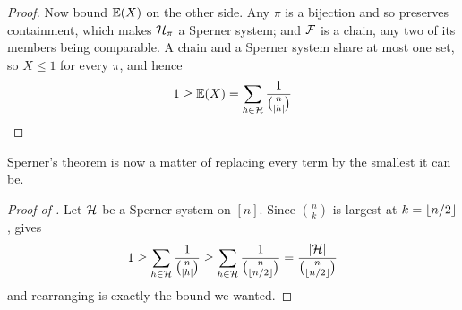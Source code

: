 \begin{proof}
    Now bound $\mathbb{E}\!\left( X \right)$ on the other side. Any $\pi$ is a bijection and so preserves containment, which makes $\mathcal{H}_{\pi}$ a Sperner system; and $\mathcal{F}$ is a chain, any two of its members being comparable. A chain and a Sperner system share at most one set, so $X \leq 1$ for every $\pi$, and hence
    \begin{align*}
        1 \geq \mathbb{E}\!\left( X \right) = \sum_{h \in \mathcal{H}} \frac{1}{\binom{n}{\left\lvert h \right\rvert}}
    \end{align*}
\end{proof}

Sperner's theorem is now a matter of replacing every term by the smallest it can be.

\begin{proof}[Proof of ]
    Let $\mathcal{H}$ be a Sperner system on $[n]$. Since $\binom{n}{k}$ is largest at $k = \left\lfloor n / 2 \right\rfloor$,  gives
    \begin{align*}
        1 \geq \sum_{h \in \mathcal{H}} \frac{1}{\binom{n}{\left\lvert h \right\rvert}} \geq \sum_{h \in \mathcal{H}} \frac{1}{\binom{n}{\left\lfloor n / 2 \right\rfloor}} = \frac{\left\lvert \mathcal{H} \right\rvert}{\binom{n}{\left\lfloor n / 2 \right\rfloor}}
    \end{align*}
    and rearranging is exactly the bound we wanted.
\end{proof}
